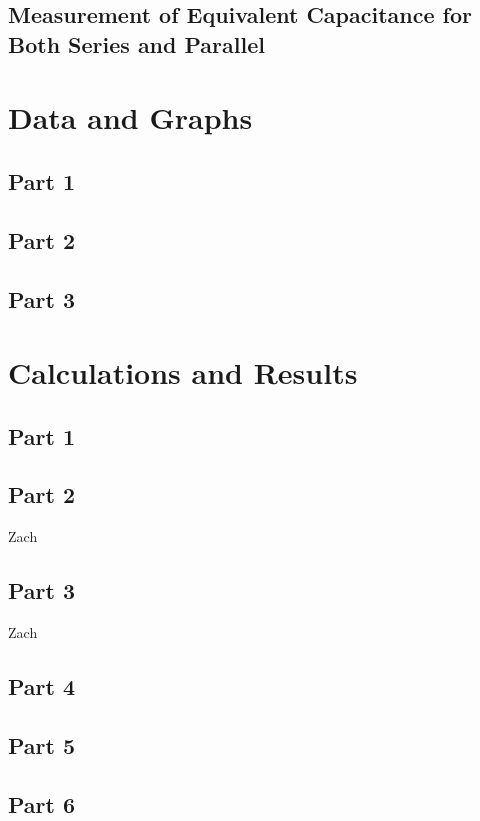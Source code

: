 \documentclass[titlepage]{article}
\begin{document}
        \subsection{Measurement of Equivalent Capacitance for Both Series and Parallel}



	\section{Data and Graphs}
	    \subsection{Part 1}


	    \subsection{Part 2} 


	    \subsection{Part 3}

    \section{Calculations and Results}

        \subsection{Part 1} 

        \subsection{Part 2} 
        Zach

        \subsection{Part 3} 
        Zach

        \subsection{Part 4} 
        \subsection{Part 5} 
        \subsection{Part 6} 
\end{document}
